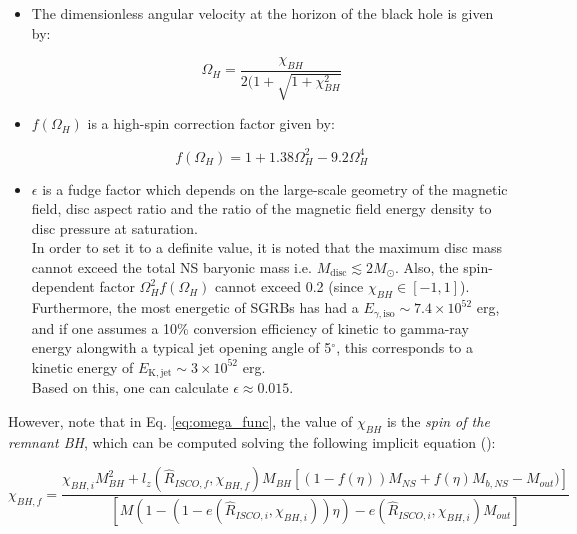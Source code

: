     \begin{itemize}

        \item The dimensionless angular velocity at the horizon of the black hole is
            given by:

            \begin{equation}
                \Omega_H = \dfrac{\chi_{BH}}{2(1 + \sqrt{1 + \chi_{BH}^2}}
                \label{eq:omega_func}
            \end{equation}

        \item $f(\Omega_H)$ is a high-spin correction factor given by:

            \begin{equation}
               f(\Omega_H) = 1 + 1.38\Omega_H^2 - 9.2 \Omega_H^4
               \label{eq:Omega_h}
            \end{equation}

        \item $\epsilon$ is a fudge factor which depends on the large-scale geometry of
            the magnetic field, disc aspect ratio and the ratio of the magnetic field
            energy density to disc pressure at saturation.\\ In order to set it to a
            definite value, it is noted that the maximum disc mass cannot exceed the
            total NS baryonic mass i.e. $M_{\mathrm{disc}} \lesssim 2M_\odot$. Also, the
            spin-dependent factor $\Omega_H^2f(\Omega_H)$ cannot exceed 0.2 (since
            $\chi_{BH} \in [-1, 1]$). Furthermore, the most energetic of SGRBs has had a
            $E_{\gamma, \mathrm{iso}} \sim 7.4 \times 10^{52}$ erg, and if one assumes a
            10\% conversion efficiency of kinetic to gamma-ray energy alongwith a
            typical jet opening angle of 5$^{\circ}$, this corresponds to a kinetic
            energy of $E_{\mathrm{K, jet}} \sim 3 \times 10^{52}$ erg.\\
            Based on this, one can calculate $\boxed{\epsilon \approx 0.015}$.

    \end{itemize}

    However, note that in Eq. \ref{eq:omega_func}, the value of $\chi_{BH}$ is the
    \emph{spin of the remnant BH}, which can be computed solving the following implicit
    equation (\cite{pannarale_2013}):

    \begin{equation}
        \chi_{BH, f} = \dfrac
            {
                \chi_{BH, i}M_{BH}^2 + l_z(\hat{R}_{ISCO, f}, \chi_{BH, f}) M_{BH}
                [ (1 - f(\eta))M_{NS} + f(\eta) M_{b, NS} - M_{out}) ]
            }
            {
                [M (1 - ( 1 - e(\hat{R}_{ISCO, i}, \chi_{BH, i}) ) \eta ) -
                e(\hat{R}_{ISCO, i}, \chi_{BH, i}) M_{out}]
            }
    \end{equation}


